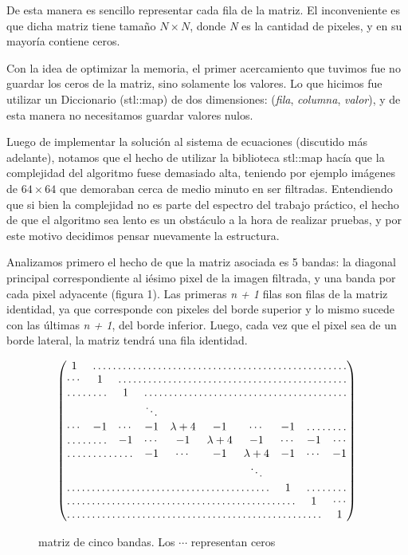 \documentclass[a4paper]{article}
\begin{document}
De esta manera es sencillo representar cada fila de la matriz. El inconveniente es que dicha matriz tiene tamaño $N \times N$, donde \textit{N} es la cantidad de pixeles, y en su mayoría contiene ceros.

Con la idea de optimizar la memoria, el primer acercamiento que tuvimos fue no guardar los ceros de la matriz, sino solamente los valores. Lo que hicimos fue utilizar un Diccionario (stl::map) de dos dimensiones: (\textit{fila}, \textit{columna}, \textit{valor}), y de esta manera no necesitamos guardar valores nulos. \vspace{1em}

Luego de implementar la solución al sistema de ecuaciones (discutido más adelante), notamos que el hecho de utilizar la biblioteca stl::map hacía que la complejidad del algoritmo fuese demasiado alta, teniendo por ejemplo imágenes de $64 \times 64$ que demoraban cerca de medio minuto en ser filtradas. Entendiendo que si bien la complejidad no es parte del espectro del trabajo práctico, el hecho de que el algoritmo sea lento es un obstáculo a la hora de realizar pruebas, y por este motivo decidimos pensar nuevamente la estructura. \vspace{1em}

Analizamos primero el hecho de que la matriz asociada es 5 bandas: la diagonal principal correspondiente al iésimo pixel de la imagen filtrada, y una banda por cada pixel adyacente (figura 1).
Las primeras \textit{n + 1} filas son filas de la matriz identidad, ya que corresponde con pixeles del borde superior y lo mismo sucede con las últimas \textit{n + 1}, del borde inferior. Luego, cada vez que el pixel sea de un borde lateral, la matriz tendrá una fila identidad.

\begin{figure}[H]
$$
 \begin{pmatrix}
  1 & \hdotsfor{9} \\  
  \cdots & 1 & \hdotsfor{8} \\
  \hdotsfor{2} & 1 & \hdotsfor{7} \\  
  & & & \ddots \\
  \cdots &-1 & \cdots & -1 & \lambda + 4 & -1 & \cdots & -1 & \hdotsfor{2} \\
  \hdotsfor{2} & -1 & \cdots & -1 & \lambda + 4 & -1 & \cdots & -1 & \cdots \\
  \hdotsfor{3} & -1 & \cdots & -1 & \lambda + 4 & -1 & \cdots & -1 \\
  & & & & & & \ddots \\
  \hdotsfor{7} & 1 & \hdotsfor{2} \\
  \hdotsfor{8} & 1 & \cdots \\
  \hdotsfor{9} & 1 \\
 \end{pmatrix}
$$
 \caption{matriz de cinco bandas. Los $\cdots$ representan ceros}
\end{figure}
\end{document}
